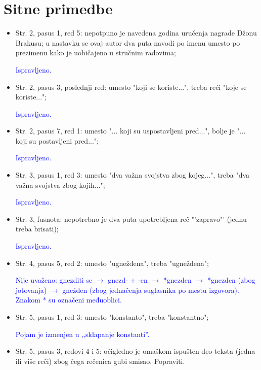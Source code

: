 \documentclass[a4paper]{report}
\newcommand{\odgovor}[1]{\textcolor{blue}{#1}}
\begin{document}
\section{Sitne primedbe}
\begin{itemize}
	\item Str. 2, pasus 1, red 5: nepotpuno je navedena godina uručenja nagrade Džonu Brakusu; u nastavku se ovaj autor dva puta navodi po imenu umesto po prezimenu kako je uobičajeno u stručnim radovima;
	
	\odgovor{Ispravljeno.}
	
	\item Str. 2, pasus 3, poslednji red: umesto "koji se koriste...", treba reći "koje se koriste...";
	
	\odgovor{Ispravljeno.}
	
	\item Str. 2, pasus 7, red 1: umesto "... koji su uspostavljeni pred...", bolje je "... koji su postavljeni pred..."; 
	
	\odgovor{Ispravljeno.}
	
	\item Str. 3, pasus 1, red 3: umesto "dva važna svojstva zbog kojeg...", treba "dva važna svojstva zbog kojih...";
	
	\odgovor{Ispravljeno.}
	
	\item Str. 3, fusnota: nepotrebno je dva puta upotrebljena reč "'zapravo"' (jednu treba brisati);
	
	\odgovor{Ispravljeno.}
	
	\item Str. 4, pasus 5, red 2: umesto "ugnežđena", treba "ugneždena";
	
	\odgovor{Nije uvaženo: gnezditi se $\rightarrow$ gnezd- + -en $\rightarrow$ *gnezden $\rightarrow$ *gnezđen (zbog jotovanja) $\rightarrow$ gnežđen (zbog jednačenja suglasnika po mestu izgovora). Znakom * su označeni međuoblici.}
	
	\item Str. 5, pasus 1, red 3: umesto "konstanto", treba "konstantno";
	
	\odgovor{Pojam je izmenjen u ‚‚sklapanje konstanti''.}
	
	\item Str. 5, pasus 3, redovi 4 i 5: očigledno je omaškom ispušten deo teksta (jedna ili više reči) zbog čega rečenica gubi smisao. Popraviti.



\end{itemize}
\end{document}
